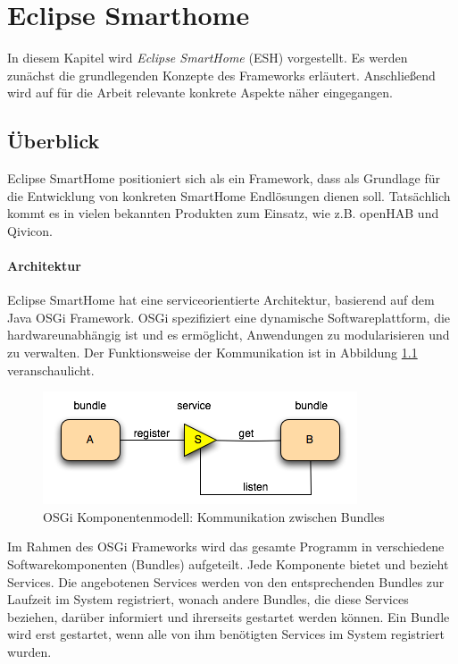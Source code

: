 \chapter{Eclipse Smarthome}
\label{chap:esh}
In diesem Kapitel wird \textit{Eclipse SmartHome} (ESH) \cite{ESH:home} vorgestellt. Es werden zunächst die grundlegenden Konzepte des Frameworks erläutert. Anschließend wird auf für die Arbeit relevante konkrete Aspekte näher eingegangen.

\section{Überblick}
Eclipse SmartHome positioniert sich als ein Framework, dass als Grundlage für die Entwicklung von konkreten SmartHome Endlösungen dienen soll. Tatsächlich kommt es in vielen bekannten Produkten zum Einsatz, wie z.B. openHAB\cite{openHAB} und Qivicon\cite{qivicon}.


\subsubsection{Architektur}
Eclipse SmartHome hat eine serviceorientierte Architektur, basierend auf dem Java OSGi Framework\cite{osgibook}. OSGi spezifiziert eine dynamische Softwareplattform, die hardwareunabhängig ist und es ermöglicht, Anwendungen zu modularisieren und zu verwalten. Der Funktionsweise der Kommunikation ist in Abbildung \ref{fig:osgi} veranschaulicht.

\begin{figure}[h]
	\centering
	\includegraphics{bilder/osgi}
	\caption{OSGi Komponentenmodell: Kommunikation zwischen Bundles \cite{osgi:whatisit}}
	\label{fig:osgi}
\end{figure}

Im Rahmen des OSGi Frameworks wird das gesamte Programm in verschiedene Softwarekomponenten (Bundles) aufgeteilt. Jede Komponente bietet und bezieht Services. Die angebotenen Services werden von den entsprechenden Bundles zur Laufzeit im System registriert, wonach andere Bundles, die diese Services beziehen, darüber informiert und ihrerseits gestartet werden können. Ein Bundle wird erst gestartet, wenn alle von ihm benötigten Services im System registriert wurden.\\

